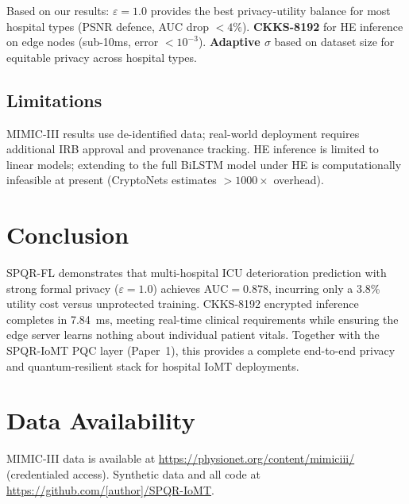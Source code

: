 \documentclass[10pt,journal,compsoc]{IEEEtran}
\begin{document}
Based on our results:
\textbf{$\varepsilon = 1.0$} provides the best privacy-utility
balance for most hospital types (PSNR defence, AUC drop $<4\%$).
\textbf{CKKS-8192} for HE inference on edge nodes (sub-10ms,
error $<10^{-3}$).
\textbf{Adaptive $\sigma$} based on dataset size for equitable
privacy across hospital types.

\subsection{Limitations}

MIMIC-III results use de-identified data; real-world deployment
requires additional IRB approval and provenance tracking.
HE inference is limited to linear models; extending to the full
BiLSTM model under HE is computationally infeasible at present
(CryptoNets estimates $>1000\times$ overhead).

\section{Conclusion}
\label{sec:conclusion}

SPQR-FL demonstrates that multi-hospital ICU deterioration prediction
with strong formal privacy ($\varepsilon=1.0$) achieves AUC$=0.878$,
incurring only a 3.8\% utility cost versus unprotected training.
CKKS-8192 encrypted inference completes in 7.84~ms, meeting real-time
clinical requirements while ensuring the edge server learns nothing
about individual patient vitals.
Together with the SPQR-IoMT PQC layer (Paper~1), this provides a
complete end-to-end privacy and quantum-resilient stack for hospital
IoMT deployments.

\section*{Data Availability}
MIMIC-III data is available at
\url{https://physionet.org/content/mimiciii/} (credentialed access).
Synthetic data and all code at
\url{https://github.com/[author]/SPQR-IoMT}.
\end{document}
